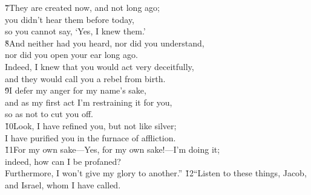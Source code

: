 \begin{poetry}
\poeml \v{7}They are created now, and not long ago; \\
\poemll    you didn't hear them before today, \\
\poemlll       so you cannot say, `Yes, I knew them.' \\
\poeml \v{8}And neither had you heard, nor did you understand, \\
\poemll    nor did you open your ear long ago. \\
\poeml Indeed, I knew that you would act very deceitfully, \\
\poemll    and they would call you a rebel from birth. \\
\poeml \v{9}I defer my anger for my name's sake, \\
\poemll    and as my first act I'm restraining it for you, \\
\poemlll       so as not to cut you off. \\
\poeml \v{10}Look, I have refined you, but not like silver; \\
\poemll    I have purified you in the furnace of affliction. \\
\poeml \v{11}For my own sake---Yes, for my own sake!---I'm doing it; \\
\poemll    indeed, how can I be profaned? \\
\poemlll       Furthermore, I won't give my glory to another.''
\poeml \v{12}``Listen to these things, Jacob, \\
\poemll    and Israel, whom I have called. \\

\end{poetry}
